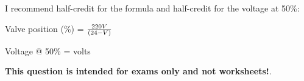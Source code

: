 
I recommend half-credit for the formula and half-credit for the voltage at 50\%:

\vskip 10pt

Valve position (\%) = ${220 V} \over (24 - V)$

\vskip 20pt

Voltage @ 50\% =  volts







{\bf This question is intended for exams only and not worksheets!}.




